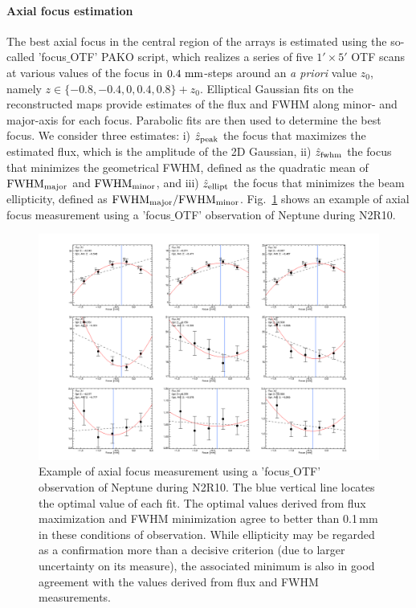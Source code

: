 
\paragraph{Axial focus estimation}
\label{sec:focus-meas}

The best axial focus in the central region of the arrays is estimated
using the so-called 'focus$\_$OTF' PAKO script, which realizes a
series of five $1' \times 5'$ OTF scans at various values of
the focus in $0.4~\rm{mm}$-steps around an \emph{a priori} value $z_0$,
namely $z \in \{-0.8, -0.4, 0, 0.4, 0.8\} + z_0$. Elliptical Gaussian
fits on the reconstructed maps provide estimates of the flux and FWHM
along minor- and major-axis for each focus. Parabolic fits are then
used to determine the best focus. We consider three estimates: i)
$\hat z_{\rm{peak}}$ the focus that maximizes the estimated flux,
which is the amplitude of the 2D Gaussian, 
ii) $\hat z_{\rm{fwhm}}$ the focus that
minimizes the geometrical FWHM, defined as the quadratic mean of
$\rm{FWHM}_{\rm{major}}$ and $\rm{FWHM}_{\rm{minor}}$,  and iii)
$\hat z_{\rm{ellipt}}$ the focus that minimizes the beam ellipticity,
defined as $\rm{FWHM}_{\rm{major}}/\rm{FWHM}_{\rm{minor}}$.
Fig.~\ref{fig:focus-example} shows an example of
axial focus measurement using a 'focus$\_$OTF' observation of Neptune
during N2R10.

\begin{figure}
\begin{center}
  \includegraphics[clip, angle=0, scale=0.25]{Figures/plot_20170419s143.png}
\caption[Axial focus measure]{Example of axial focus measurement using a
  'focus$\_$OTF' observation of Neptune during N2R10. The blue vertical line
  locates the optimal value of each fit. The optimal values derived from flux
  maximization and FWHM minimization agree to better than 0.1\,mm in these
  conditions of observation. While ellipticity may be regarded as a confirmation
  more than a decisive criterion (due to larger uncertainty on its measure), the
  associated minimum is also in good agreement with the values derived from flux
  and FWHM measurements.}
\label{fig:focus-example}
\end{center}
\end{figure}

